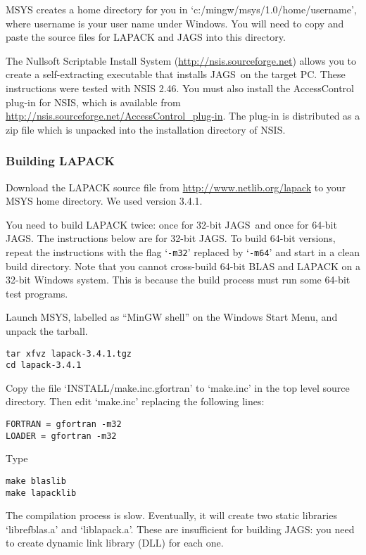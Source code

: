 \documentclass[11pt, a4paper, titlepage]{article}
\newcommand{\JAGS}{\textsf{JAGS}}
\newcommand{\code}[1]{{\bgroup{\normalfont\ttfamily #1}\egroup}}
\newcommand{\samp}[1]{{`\bgroup\normalfont\texttt{#1}'\egroup}}
\newcommand{\file}[1]{{`\normalfont\textsf{#1}'}}
\let\option=\samp
\begin{document}
MSYS creates a home directory for you in
\file{c:/mingw/msys/1.0/home/username}, where \code{username} is
your user name under Windows. You will need to copy and paste the
source files for LAPACK and JAGS into this directory.

The Nullsoft Scriptable Install System
(\url{http://nsis.sourceforge.net}) allows you to create a
self-extracting executable that installs \JAGS\ on the target PC.
These instructions were tested with NSIS 2.46.  You must also install
the AccessControl plug-in for NSIS, which is available from
\url{http://nsis.sourceforge.net/AccessControl_plug-in}. The plug-in
is distributed as a zip file which is unpacked into the installation
directory of NSIS.

\subsubsection{Building LAPACK}

Download the LAPACK source file from
\url{http://www.netlib.org/lapack} to your MSYS home directory. We
used version 3.4.1.

You need to build LAPACK twice: once for 32-bit \JAGS\ and once for
64-bit \JAGS. The instructions below are for 32-bit \JAGS. To build
64-bit versions, repeat the instructions with the flag \option{-m32}
replaced by \option{-m64} and start in a clean build directory.  Note
that you cannot cross-build 64-bit BLAS and LAPACK on a 32-bit Windows
system. This is because the build process must run some 64-bit test
programs.

Launch MSYS, labelled as ``MinGW shell'' on the Windows Start Menu,
and unpack the tarball.
\begin{verbatim}
tar xfvz lapack-3.4.1.tgz
cd lapack-3.4.1
\end{verbatim}
Copy the file \file{INSTALL/make.inc.gfortran} to \file{make.inc} in
the top level source directory.  Then edit \file{make.inc} replacing
the following lines:
\begin{verbatim}
FORTRAN = gfortran -m32
LOADER = gfortran -m32
\end{verbatim}
Type
\begin{verbatim}
make blaslib
make lapacklib 
\end{verbatim}
The compilation process is slow. Eventually, it will create two static
libraries \file{librefblas.a} and \file{liblapack.a}. These are
insufficient for building \JAGS: you need to create dynamic link
library (DLL) for each one.
\end{document}
